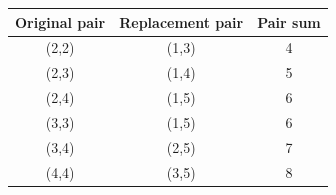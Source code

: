 \begin{tabular}{ccc}
\toprule
Original pair & Replacement pair & Pair sum \\
\midrule
(2,2) & (1,3) & 4 \\
(2,3) & (1,4) & 5 \\
(2,4) & (1,5) & 6 \\
(3,3) & (1,5) & 6 \\
(3,4) & (2,5) & 7 \\
(4,4) & (3,5) & 8 \\
\bottomrule
\end{tabular}
